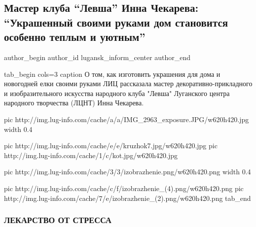  
 
 
 
 
 
\subsection{Мастер клуба \enquote{Левша} Инна Чекарева: \enquote{Украшенный своими руками дом становится особенно теплым и уютным}}
\label{sec:20_12_2020.news.lnr.lug_info.lugansk_inform_center.1.master_levsha}
\ifcmt
	author_begin
   author_id lugansk_inform_center
	author_end
\fi


\ifcmt
tab_begin cols=3
	caption О том, как изготовить украшения для дома и новогодней елки своими руками ЛИЦ рассказала мастер декоративно-прикладного и изобразительного искусства народного клуба "Левша" Луганского центра народного творчества (ЛЦНТ) Инна Чекарева.

  pic http://img.lug-info.com/cache/a/a/IMG_2963_exposure.JPG/w620h420.jpg
	width 0.4

	pic http://img.lug-info.com/cache/e/e/kruzhok7.jpg/w620h420.jpg
	pic http://img.lug-info.com/cache/1/c/kot.jpg/w620h420.jpg

	pic http://img.lug-info.com/cache/3/3/izobrazhenie.png/w620h420.png
	width 0.4

	pic http://img.lug-info.com/cache/c/f/izobrazhenie_(4).png/w620h420.png
	pic http://img.lug-info.com/cache/7/e/izobrazhenie_(2).png/w620h420.png
tab_end
\fi

\subsubsection{ЛЕКАРСТВО ОТ СТРЕССА}


